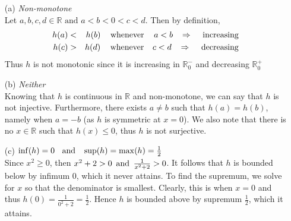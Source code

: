 \documentclass[12pt]{amsart}
\begin{document}
\begin{enumerate}
\begin{enumerate}
\begin{enumerate}
					\item[(a)] \emph{Non-monotone}\\
					Let $a,b,c,d \in \mathbb{R} \text{ and } a<b<0<c<d$. Then by definition,
					\begin{eqnarray}
						h(a)&<&h(b) \hspace{0.3cm} \text{ whenever } \hspace{0.3cm} a<b 
						\hspace{0.3cm} \Rightarrow \hspace{0.3cm} \text { increasing }\nonumber \\
						h(c)&>&h(d) \hspace{0.3cm} \text{ whenever } \hspace{0.25cm} c<d 
						\hspace{0.3cm} \Rightarrow \hspace{0.3cm} \text { decreasing }\nonumber 
					\end{eqnarray}
					Thus $h$ is not monotonic since it is increasing in $\mathbb{R}_0^-$ and 
					decreasing $\mathbb{R}_0^+$ \\
					\item[(b)] \emph{Neither}\\
					Knowing that $h$ is continuous in $\mathbb{R}$ and non-monotone, we can say 						that $h$ is not injective.  Furthermore, there exists $a \ne b$ such that $h(a) = h(b)$,
					namely when $a=-b$ (as $h$ is symmetric at $x=0$). We also note that there is no 						$x \in \mathbb{R}$ such that $h(x) \le 0$, thus $h$ is not surjective.\\
					
					\item[(c)] $\inf(h) = 0 \hspace{0.2cm} \text{ and }  \hspace{0.2cm} \sup(h) = \max(h) =
					\frac{1}{2}$ \\
					Since $x^2\ge0$, then \hspace{0.05cm} $x^2+2>0 \hspace{0.05cm} \text{ and } 						\hspace{0.05cm} \frac{1}{x^2+2} > 0$.  It follows that $h$ is bounded below by
					infimum 0, which it never attains. To find the supremum, we solve for $x$ so that
					the denominator is smallest.  Clearly, this is when $x=0$ and thus $h(0) = 
					\frac{1}{0^2+2} = \frac{1}{2}$. Hence $h$ is bounded above by supremum 
					$\frac{1}{2}$, which it attains.\\
		

\end{enumerate}
\end{enumerate}
\end{enumerate}
\end{document}
